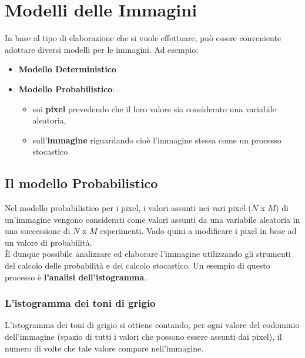 \section{Modelli delle Immagini}

In base al tipo di elaborazione che si vuole effettuare, può essere conveniente
adottare diversi modelli per le immagini. Ad esempio:

\begin{itemize}
    \item \textbf{Modello Deterministico}
    \item \textbf{Modello Probabilistico}:
          \begin{itemize}
              \item sui \textbf{pixel} prevedendo che il loro valore sia
                    considerato una variabile aleatoria,
              \item sull'\textbf{immagine} riguardando cioè l'immagine stessa
                    come un processo stocastico

          \end{itemize}
\end{itemize}

\subsection{Il modello Probabilistico}

Nel modello probabilistico per i pixel, i valori assunti nei vari pixel ($N$ x
$M$) di un'immagine vengono considerati come valori assunti da una variabile
aleatoria in una successione di $N$ x $M$ esperimenti. Vado quini a modificare i
pixel in base ad un valore di probabilità. \\È dunque possibile analizzare ed
elaborare l'immagine utilizzando gli strumenti del calcolo delle probabilità e
del calcolo stocastico. Un esempio di questo processo è \textbf{l'analisi
    dell'istogramma}.

\subsubsection{L'istogramma dei toni di grigio}

\begin{definition}
    L'istogramma dei toni di grigio si ottiene contando, per ogni valore del
    codominio dell'immagine (spazio di tutti i valori che possono essere assunti
    dai pixel), il numero di volte che tale valore compare nell'immagine.
\end{definition}

